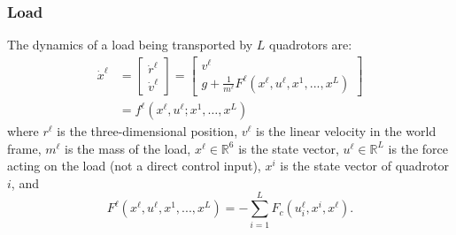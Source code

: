\documentclass[../root.tex]{subfiles}
\begin{document}
\subsubsection{Load}
The dynamics of a load being transported by $L$ quadrotors are:
\begin{equation} \label{eq:load_dynamics}
\begin{aligned}
\dot{x}^\ell &= 
\begin{bmatrix}
\dot{r}^\ell \\ \dot{v}^\ell 
\end{bmatrix} =
\begin{bmatrix}
v^\ell \\ g + \frac{1}{m^\ell} F^\ell(x^{\ell},u^{\ell}, x^1,..., x^L)
\end{bmatrix} \\
&= f^\ell(x^\ell, u^\ell; x^1, \dots, x^L)
\end{aligned}
\end{equation}
where $r^\ell$ is the three-dimensional position, $v^\ell$ is the linear
velocity in the world frame, $m^\ell$ is the mass of the load, $x^\ell \in
\mathbb{R}^6$ is the state vector, $u^\ell \in \mathbb{R}^L$ is the force
acting on the load (not a direct control input), $x^i$ is the state vector of
quadrotor $i$, and
\begin{equation}
F^\ell(x^{\ell},u^\ell, x^1, ..., x^L) = - \sum_{i=1}^L F_c(u^\ell_i, x^i, x^\ell).
\end{equation}
\end{document}
